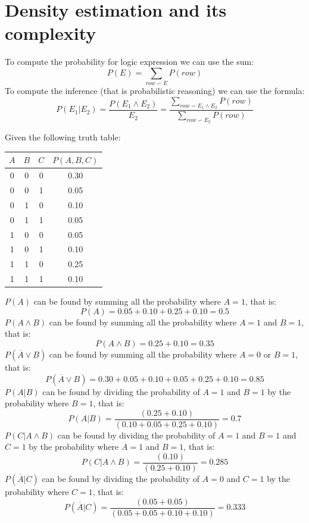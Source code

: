 \documentclass[12pt, a4paper]{report}
\begin{document}
    \section{Density estimation and its complexity}
    To compute the probability for logic expression we can use the sum: 
    \[P(E)=\sum_{row \backsim E}P(row)\]
    To compute the inference (that is probabilistic reasoning) we can use the formula: 
    \[P(E_1|E_2)=\dfrac{P(E_1 \land E_2)}{E_2}=\dfrac{\sum_{row \backsim E_1 \land E_2}P(row)}{\sum_{row \backsim E_2}P(row)}\]
    \begin{example}
        Given the following truth table: 
        \begin{table}[H]
            \centering
            \begin{tabular}{|c|c|c|c|}
            \hline
            $A$ & $B$ & $C$ & $P(A,B,C)$ \\ \hline
            0   & 0   & 0   & 0.30       \\ \hline
            0   & 0   & 1   & 0.05       \\ \hline
            0   & 1   & 0   & 0.10       \\ \hline
            0   & 1   & 1   & 0.05       \\ \hline
            1   & 0   & 0   & 0.05       \\ \hline
            1   & 0   & 1   & 0.10       \\ \hline
            1   & 1   & 0   & 0.25       \\ \hline
            1   & 1   & 1   & 0.10       \\ \hline
            \end{tabular}
        \end{table}
        $P(A)$ can be found by summing all the probability where $A=1$, that is: 
        \[P(A) = 0.05 + 0.10 + 0.25 + 0.10 = 0.5\]
        $P(A \land B)$ can be found by summing all the probability where $A=1$ and $B=1$, that is: 
        \[P(A \land B) = 0.25 + 0.10 = 0.35\]
        $P(\overline{A} \lor B)$ can be found by summing all the probability where $A=0$ or $B=1$, that is: 
        \[P(\overline{A} \lor B) = 0.30 + 0.05 + 0.10 + 0.05 + 0.25 + 0.10 = 0.85\]
        $P(A | B)$ can be found by dividing the probability of $A=1$ and $B=1$ by the probability where $B=1$, that is: 
        \[P(A | B) = \dfrac{(0.25+0.10)}{(0.10+0.05+0.25+0.10)}=0.7\]
        $P(C | A \land B)$ can be found by dividing the probability of $A=1$ and $B=1$ and $C=1$ by the probability where $A=1$ and $B=1$, that is: 
        \[P(C | A \land B) = \dfrac{(0.10)}{(0.25+0.10)}=0.285\]
        $P(\overline{A} | C)$ can be found by dividing the probability of $A=0$ and $C=1$ by the probability where $C=1$, that is: 
        \[P(\overline{A} | C) = \dfrac{(0.05+0.05)}{(0.05+0.05+0.10+0.10)}=0.333\]
    \end{example}
\end{document}
